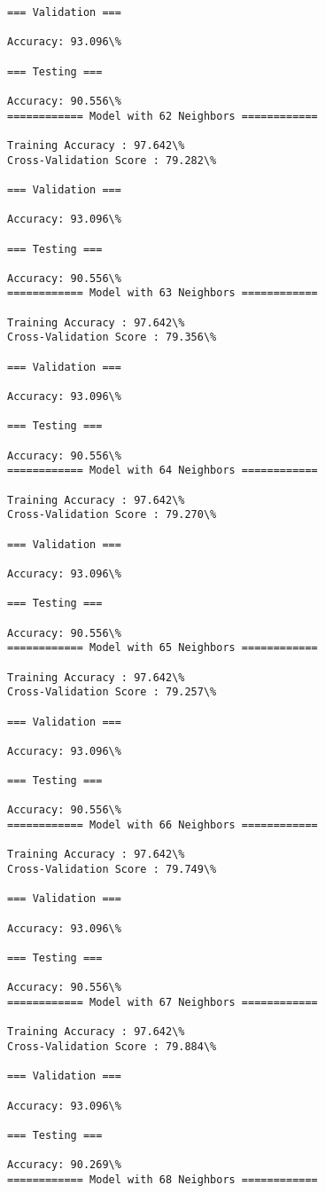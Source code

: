 \documentclass[11pt]{article}
\begin{document}
\begin{Verbatim}[commandchars=\\\{\}]
=== Validation ===

Accuracy: 93.096\%

=== Testing ===

Accuracy: 90.556\%
============ Model with 62 Neighbors ============

Training Accuracy : 97.642\%
Cross-Validation Score : 79.282\%

=== Validation ===

Accuracy: 93.096\%

=== Testing ===

Accuracy: 90.556\%
============ Model with 63 Neighbors ============

Training Accuracy : 97.642\%
Cross-Validation Score : 79.356\%

=== Validation ===

Accuracy: 93.096\%

=== Testing ===

Accuracy: 90.556\%
============ Model with 64 Neighbors ============

Training Accuracy : 97.642\%
Cross-Validation Score : 79.270\%

=== Validation ===

Accuracy: 93.096\%

=== Testing ===

Accuracy: 90.556\%
============ Model with 65 Neighbors ============

Training Accuracy : 97.642\%
Cross-Validation Score : 79.257\%

=== Validation ===

Accuracy: 93.096\%

=== Testing ===

Accuracy: 90.556\%
============ Model with 66 Neighbors ============

Training Accuracy : 97.642\%
Cross-Validation Score : 79.749\%

=== Validation ===

Accuracy: 93.096\%

=== Testing ===

Accuracy: 90.556\%
============ Model with 67 Neighbors ============

Training Accuracy : 97.642\%
Cross-Validation Score : 79.884\%

=== Validation ===

Accuracy: 93.096\%

=== Testing ===

Accuracy: 90.269\%
============ Model with 68 Neighbors ============


\end{Verbatim}
\end{document}
